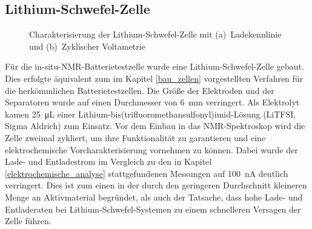 \documentclass[a4paper, 11pt, headsepline,footsepline,twoside,abstract]{scrbook}
\begin{document}
\subsection{Lithium-Schwefel-Zelle}
\begin{figure}[b!]
   \centering
       \vspace{3mm}
       \vspace{3mm}
	\caption{Charakterisierung der Lithium-Schwefel-Zelle mit (a)~Ladekennlinie und (b)~Zyklischer Voltametrie}
   	\label{ec_LiS}
\end{figure}
Für die in-situ-NMR-Batterietestzelle wurde eine Lithium-Schwefel-Zelle gebaut. Dies erfolgte äquivalent zum im Kapitel \ref{bau_zellen} vorgestellten Verfahren für die herkömmlichen Batterietestzellen. Die Größe der Elektroden und der Separatoren wurde auf einen Durchmesser von \SI{6}{\milli\meter} verringert. Als Elektrolyt kamen \SI{25}{\micro\liter} einer Lithium-bis(trifluoromethansulfonyl)imid-Lösung (LiTFSI, Sigma Aldrich) zum Einsatz. Vor dem Einbau in das NMR-Spektroskop wird die Zelle zweimal zykliert, um ihre Funktionalität zu garantieren und eine elektrochemische Vorcharakterisierung vornehmen zu können. Dabei wurde der Lade- und Entladestrom im Vergleich zu den in Kapitel \ref{elektrochemische_analyse} stattgefundenen Messungen auf \SI{100}{\nano\ampere} deutlich verringert. Dies ist zum einen in der durch den geringeren Durchschnitt kleineren Menge an Aktivmaterial begründet, als auch der Tatsache, dass hohe Lade- und Entladeraten bei Lithium-Schwefel-Systemen zu einem schnelleren Versagen der Zelle führen. 
\end{document}
